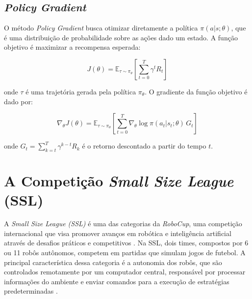 \subsection{\textit{Policy Gradient}}

O método \textit{Policy Gradient} busca otimizar diretamente a política \( \pi(a|s; \theta) \), que é uma distribuição de probabilidade sobre as ações dado um estado. A função objetivo é maximizar a recompensa esperada:

\[
J(\theta) = \mathbb{E}_{\tau \sim \pi_\theta} \left[ \sum_{t=0}^T \gamma^t R_t \right]
\]

onde \( \tau \) é uma trajetória gerada pela política \( \pi_\theta \). O gradiente da função objetivo é dado por:

\[
\nabla_\theta J(\theta) = \mathbb{E}_{\tau \sim \pi_\theta} \left[ \sum_{t=0}^T \nabla_\theta \log \pi(a_t|s_t; \theta) \, G_t \right]
\]

onde \( G_t = \sum_{k=t}^T \gamma^{k-t} R_k \) é o retorno descontado a partir do tempo \( t \).





  


\section{A Competição \textit{Small Size League} (SSL)}

A \textit{Small Size League (SSL)} é uma das categorias da \textit{RoboCup}, uma competição internacional que visa promover avanços em robótica e inteligência artificial através de desafios práticos e competitivos \cite{kitano1997robocup}. Na SSL, dois times, compostos por 6 ou 11 robôs autônomos, competem em partidas que simulam jogos de futebol. A principal característica dessa categoria é a autonomia dos robôs, que são controlados remotamente por um computador central, responsável por processar informações do ambiente e enviar comandos para a execução de estratégias predeterminadas \cite{zickler2009shared}.


